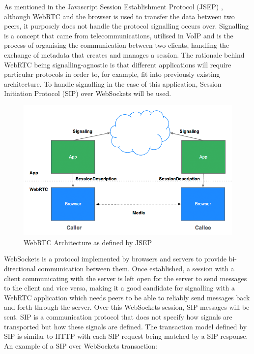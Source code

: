 \documentclass[]{report}
\begin{document}
	As mentioned in the Javascript Session Establishment Protocol (JSEP) \cite{JSEP}, although WebRTC and the browser is used to transfer the data between two peers, it purposely does not handle the protocol signalling occurs over. Signalling is a concept that came from telecommunications, utilised in VoIP and is the process of organising the communication between two clients, handling the exchange of metadata that creates and manages a session. The rationale behind WebRTC being signalling-agnostic is that different applications will require particular protocols in order to, for example, fit into previously existing architecture. To handle signalling in the case of this application, Session Initiation Protocol (SIP) over WebSockets will be used.
	
	\begin{figure}[H]
		\caption{WebRTC Architecture as defined by JSEP \cite{JSEP}}
		\includegraphics[scale=0.4]{jsep.png}
	\end{figure}
	
	WebSockets is a protocol implemented by browsers and servers to provide bi-directional communication between them\cite{WebSockets}. Once established, a session with a client communicating with the server is left open for the server to send messages to the client and vice versa, making it a good candidate for signalling with a WebRTC application which needs peers to be able to reliably send messages back and forth through the server. Over this WebSockets session, SIP messages will be sent. SIP is a communication protocol that does not specify how signals are transported but how these signals are defined. The transaction model defined by SIP is similar to HTTP with each SIP request being matched by a SIP response. An example of a SIP over WebSockets transaction:\cite{SIP Over WebSockets}
	
\end{document}
